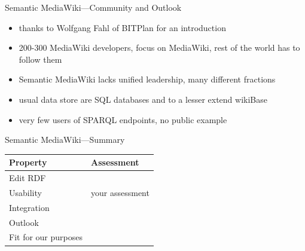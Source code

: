 \documentclass[aspectratio=1610]{beamer}
\newcommand{\cmark}{\ding{51}}%
\newcommand{\xmark}{\ding{55}}%
\begin{document}
\begin{frame}{Semantic MediaWiki---Community and Outlook}
\begin{itemize}
\item thanks to Wolfgang Fahl of BITPlan for an introduction
\item 200-300 MediaWiki developers, focus on MediaWiki, rest of the world has to follow them
\item Semantic MediaWiki lacks unified leadership, many different fractions
\item usual data store are SQL databases and to a lesser extend wikiBase
\item very few users of SPARQL endpoints, no public example 
\end{itemize}
\end{frame}

\begin{frame}{Semantic MediaWiki---Summary}
\centering
\begin{tabulary}{\textwidth}{lL}
\toprule
Property		&Assessment\\
\midrule
Edit RDF		&\cmark\\
Usability		&your assessment\\
Integration		&\xmark\\
Outlook			&\xmark\\
\midrule
Fit for our purposes	&\xmark\\
\bottomrule
\end{tabulary}
\end{frame}
\end{document}
